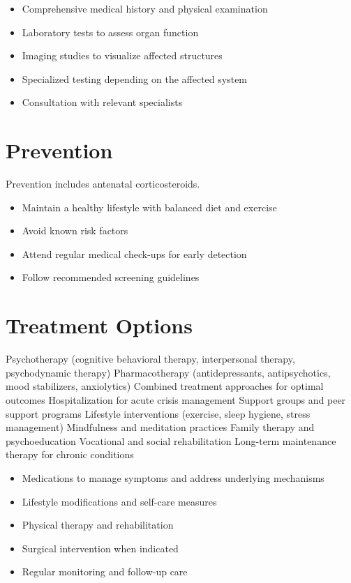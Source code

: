 \begin{itemize}[noitemsep]
  \item Comprehensive medical history and physical examination
  \item Laboratory tests to assess organ function
  \item Imaging studies to visualize affected structures
  \item Specialized testing depending on the affected system
  \item Consultation with relevant specialists
\end{itemize}
\section{Prevention}
Prevention includes antenatal corticosteroids.

\begin{itemize}[noitemsep]
  \item Maintain a healthy lifestyle with balanced diet and exercise
  \item Avoid known risk factors
  \item Attend regular medical check-ups for early detection
  \item Follow recommended screening guidelines
\end{itemize}
\section{Treatment Options}
Psychotherapy (cognitive behavioral therapy, interpersonal therapy, psychodynamic therapy) Pharmacotherapy (antidepressants, antipsychotics, mood stabilizers, anxiolytics) Combined treatment approaches for optimal outcomes Hospitalization for acute crisis management Support groups and peer support programs Lifestyle interventions (exercise, sleep hygiene, stress management) Mindfulness and meditation practices Family therapy and psychoeducation Vocational and social rehabilitation Long-term maintenance therapy for chronic conditions

\begin{itemize}[noitemsep]
  \item Medications to manage symptoms and address underlying mechanisms
  \item Lifestyle modifications and self-care measures
  \item Physical therapy and rehabilitation
  \item Surgical intervention when indicated
  \item Regular monitoring and follow-up care
\end{itemize}
